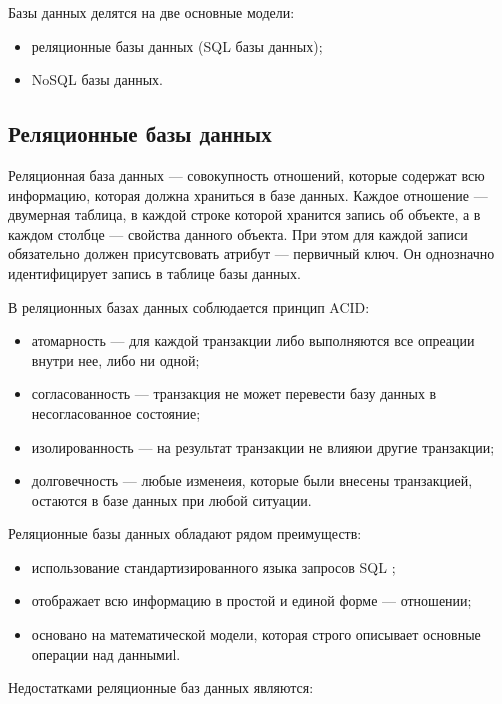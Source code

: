 Базы данных делятся на две основные модели:

\begin{itemize}
    \item реляционные базы данных (SQL базы данных);
    \item NoSQL базы данных.
\end{itemize}


\subsection{Реляционные базы данных}

Реляционная база данных \cite{db-sql} --- совокупность отношений, которые содержат всю информацию, которая должна храниться в базе данных. Каждое отношение --- двумерная таблица, в каждой строке которой хранится запись об объекте, а в каждом столбце --- свойства данного объекта. При этом для каждой записи обязательно должен присутсвовать атрибут --- первичный ключ. Он однозначно идентифицирует запись в таблице базы данных.

В реляционных базах данных соблюдается принцип ACID:

\begin{itemize}
    \item атомарность --- для каждой транзакции либо выполняются все опреации внутри нее, либо ни одной;
    \item согласованность --- транзакция не может перевести базу данных в несогласованное состояние;
    \item изолированность --- на результат транзакции не влияюи другие транзакции;
    \item долговечность --- любые изменеия, которые были внесены транзакцией, остаются в базе данных при любой ситуации.
\end{itemize}

Реляционные базы данных обладают рядом преимуществ:

\begin{itemize}
    \item использование стандартизированного языка запросов SQL \cite{sql-is};
    \item отображает всю информацию в простой и единой форме --- отношении;
    \item основано на математической модели, которая строго описывает основные операции над даннымиl.
\end{itemize}

Недостатками реляционные баз данных являются:

